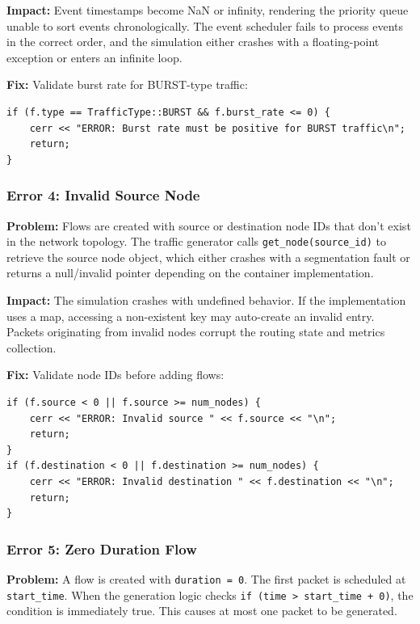 \documentclass[11pt,a4paper]{article}
\begin{document}
\textbf{Impact:}
Event timestamps become NaN or infinity, rendering the priority queue unable to sort events chronologically. The event scheduler fails to process events in the correct order, and the simulation either crashes with a floating-point exception or enters an infinite loop.

\textbf{Fix:}
Validate burst rate for BURST-type traffic:
\begin{lstlisting}
if (f.type == TrafficType::BURST && f.burst_rate <= 0) {
    cerr << "ERROR: Burst rate must be positive for BURST traffic\n";
    return;
}
\end{lstlisting}

\vspace{0.5cm}

\subsubsection{Error 4: Invalid Source Node}

\textbf{Problem:}
Flows are created with source or destination node IDs that don't exist in the network topology. The traffic generator calls \texttt{get\_node(source\_id)} to retrieve the source node object, which either crashes with a segmentation fault or returns a null/invalid pointer depending on the container implementation.

\textbf{Impact:}
The simulation crashes with undefined behavior. If the implementation uses a map, accessing a non-existent key may auto-create an invalid entry. Packets originating from invalid nodes corrupt the routing state and metrics collection.

\textbf{Fix:}
Validate node IDs before adding flows:
\begin{lstlisting}
if (f.source < 0 || f.source >= num_nodes) {
    cerr << "ERROR: Invalid source " << f.source << "\n";
    return;
}
if (f.destination < 0 || f.destination >= num_nodes) {
    cerr << "ERROR: Invalid destination " << f.destination << "\n";
    return;
}
\end{lstlisting}

\vspace{0.5cm}

\subsubsection{Error 5: Zero Duration Flow}

\textbf{Problem:}
A flow is created with \texttt{duration = 0}. The first packet is scheduled at \texttt{start\_time}. When the generation logic checks \texttt{if (time > start\_time + 0)}, the condition is immediately true. This causes at most one packet to be generated.
\end{document}
